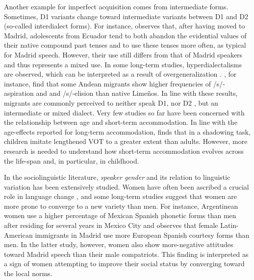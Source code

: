 \documentclass[output=paper,
modfonts
]{langscibook}
\begin{document}
% 
Another example for imperfect acquisition comes from intermediate forms. Sometimes, D1 variants change toward intermediate variants between D1 and D2 (so-called interdialect forms). For instance, \citet{PalaciosAlcaine2007} observes that, after having moved to Madrid, adolescents from Ecuador tend to both abandon the evidential values of their native compound past tenses and to use these tenses more often, as typical for Madrid speech. However, their use still differs from that of Madrid speakers and thus represents a mixed use. 
In some long-term studies, hyperdialectalisms are observed, which can be interpreted as a result of overgeneralization \citep{trudgill_dialects_1986}.
\cite{klee_andean_2006}, for instance, find that some Andean migrants show higher frequencies of /s/-aspiration and and /s/-elision than native Limeños. In line with these results, migrants are commonly perceived to neither speak D1, nor D2 \citep{siegel_second_2010}, but an intermediate or mixed dialect.
Very few studies so far have been concerned with the relationship between age and short-term accommodation. In line  with the age-effects reported for long-term accommodation, \citet{nielsen_phonetic_2014} finds that in a shadowing task, children imitate lengthened VOT to a greater extent than adults. However, more research is needed to understand how short-term accommodation evolves across the life-span and, in particular, in childhood. 
% 
% 
% 
%

In the sociolinguistic literature,  \textit{speaker gender} and its relation to linguistic variation has been extensively studied. Women have often been ascribed a crucial role in language change \citep{labov_intersection_1990}, and some long-term studies suggest that women are more prone to converge to a new variety than men.
% 
% 
% 
%
For instance, Argentinean women use a higher percentage of Mexican Spanish phonetic forms than men after residing for several years in Mexico City \citet{pesqueira_cambio_2008} and \citet{MolinaMartos2010} observes that female Latin-American immigrants in Madrid use more European Spanish courtesy forms than men. In the latter study, however, women also show more-negative attitudes toward Madrid speech than their male compatriots. This finding is interpreted as a sign of women attempting to improve their social status by converging toward the local norms.
% 
% 
% 
%
% 
%
\end{document}
